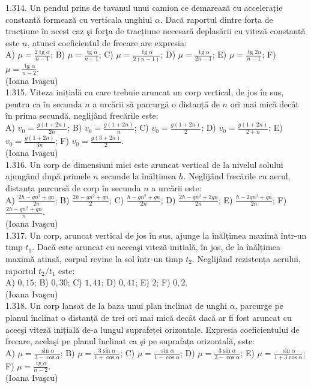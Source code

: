 1.314. Un pendul prins de tavanul unui camion ce demarează cu accelerație constantă formează cu verticala unghiul $\alpha$. Dacă raportul dintre forța de tracțiune în acest caz şi forţa de tracțiune necesară deplasării cu viteză constantă este $n$, atunci coeficientul de frecare are expresia:\\ A) $\mu=\frac{2 \operatorname{tg} \alpha}{n-1}$; B) $\mu=\frac{\operatorname{tg} \alpha}{n-1}$; C) $\mu=\frac{\operatorname{tg} \alpha}{2(n-1)}$; D) $\mu=\frac{\operatorname{tg} \alpha}{2 n-1}$; E) $\mu=\frac{\operatorname{tg} 2 \alpha}{n-1}$; F) $\mu=\frac{\operatorname{tg} \alpha}{n-2}$.\\ (Ioana Ivaşcu)\\

1.315. Viteza inițială cu care trebuie aruncat un corp vertical, de jos în sus, pentru ca în secunda $n$ a urcării să parcurgă o distanță de $n$ ori mai mică decât în prima secundă, neglijând frecările este:\\ A) $v_{0}=\frac{g(1+2 n)}{2 n}$; B) $v_{0}=\frac{g(1+2 n)}{n}$; C) $v_{0}=\frac{g(1+2 n)}{2}$; D) $v_{0}=\frac{g(1+2 n)}{2+n}$; E) $v_{0}=\frac{g(1+2 n)}{3 n}$; F) $v_{0}=\frac{g(3+2 n)}{2}$.\\ (Ioana Ivaşcu)\\

1.316. Un corp de dimensiuni mici este aruncat vertical de la nivelul solului ajungând după primele $n$ secunde la înălțimea $h$. Neglijând frecările cu aerul, distanța parcursă de corp în secunda $n$ a urcării este:\\ A) $\frac{2 h-g n^{2}+g n}{2 n}$; B) $\frac{2 h-g n^{2}+g n}{2}$; C) $\frac{h-g n^{2}+g n}{2 n}$; D) $\frac{2 h-g n^{2}+2 g n}{2 n}$; E) $\frac{h-2 g n^{2}+g n}{2 n}$; F) $\frac{2 h-g n^{2}+g n}{n}$.\\ (Ioana Ivaşcu)\\

1.317. Un corp, aruncat vertical de jos în sus, ajunge la înălțimea maximă într-un timp $t_{1}$. Dacă este aruncat cu aceeaşi viteză inițială, în jos, de la înălțimea maximă atinsă, corpul revine la sol într-un timp $t_{2}$. Neglijând rezistența aerului, raportul $t_{2} / t_{1}$ este:\\ A) $0,15$; B) $0,30$; C) $1,41$; D) $0,41$; E) $2$; F) $0,2$.\\ (Ioana Ivaşcu)\\

1.318. Un corp lansat de la baza unui plan inclinat de unghi $\alpha$, parcurge pe planul înclinat o distanță de trei ori mai mică decât dacă ar fi fost aruncat cu aceeşi viteză inițială de-a lungul suprafeței orizontale. Expresia coeficientului de frecare, acelaşi pe planul înclinat ca şi pe suprafața orizontală, este:\\ A) $\mu=\frac{\sin \alpha}{3-\cos \alpha}$; B) $\mu=\frac{3 \sin \alpha}{1+\cos \alpha}$; C) $\mu=\frac{\sin \alpha}{1-\cos \alpha}$; D) $\mu=\frac{3 \sin \alpha}{3-\cos \alpha}$; E) $\mu=\frac{\sin \alpha}{1+3 \cos \alpha}$; F) $\mu=\frac{\operatorname{tg} \alpha}{n-2}$.\\ (Ioana Ivaşcu)\\

